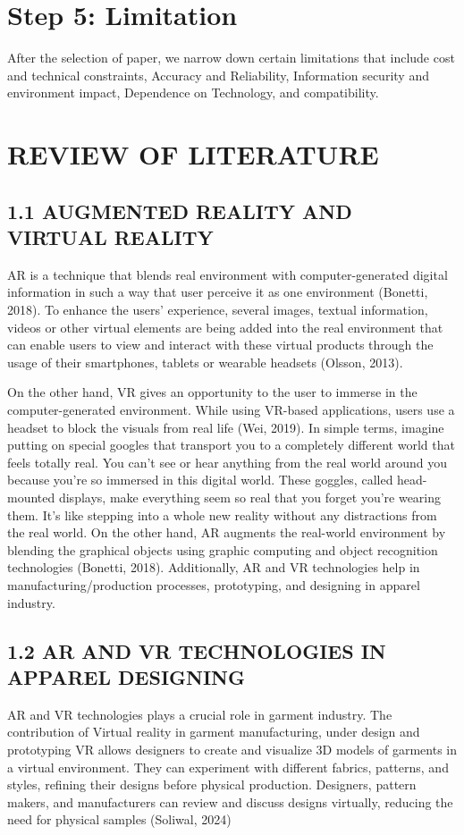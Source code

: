 \documentclass[10pt]{article}
\begin{document}
\section*{Step 5: Limitation}
After the selection of paper, we narrow down certain limitations that include cost and technical constraints, Accuracy and Reliability, Information security and environment impact, Dependence on Technology, and compatibility.

\section*{REVIEW OF LITERATURE}
\subsection*{1.1 AUGMENTED REALITY AND VIRTUAL REALITY}
AR is a technique that blends real environment with computer-generated digital information in such a way that user perceive it as one environment (Bonetti, 2018). To enhance the users' experience, several images, textual information, videos or other virtual elements are being added into the real environment that can enable users to view and interact with these virtual products through the usage of their smartphones, tablets or wearable headsets (Olsson, 2013).

On the other hand, VR gives an opportunity to the user to immerse in the computer-generated environment. While using VR-based applications, users use a headset to block the visuals from real life (Wei, 2019). In simple terms, imagine putting on special googles that transport you to a completely different world that feels totally real. You can't see or hear anything from the real world around you because you're so immersed in this digital world. These goggles, called head-mounted displays, make everything seem so real that you forget you're wearing them. It's like stepping into a whole new reality without any distractions from the real world. On the other hand, AR augments the real-world environment by blending the graphical objects using graphic computing and object recognition technologies (Bonetti, 2018). Additionally, AR and VR technologies help in manufacturing/production processes, prototyping, and designing in apparel industry.

\subsection*{1.2 AR AND VR TECHNOLOGIES IN APPAREL DESIGNING}
AR and VR technologies plays a crucial role in garment industry. The contribution of Virtual reality in garment manufacturing, under design and prototyping VR allows designers to create and visualize 3D models of garments in a virtual environment. They can experiment with different fabrics, patterns, and styles, refining their designs before physical production. Designers, pattern makers, and manufacturers can review and discuss designs virtually, reducing the need for physical samples (Soliwal, 2024)
\end{document}
